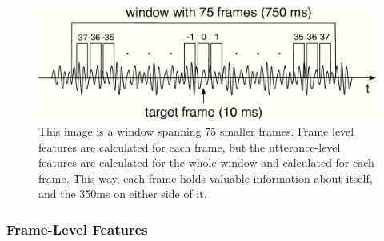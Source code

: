 \documentclass[a4paper,11pt,notitlepage]{article}
\begin{document}
\begin{figure}[H]\vspace{0.3cm}
	\centering
	\includegraphics[scale = 0.40]{figs/frames}
	\caption{This image is a window spanning 75 smaller frames. Frame level features are calculated for each frame, but the utterance-level features are calculated for the whole window and calculated for each frame. This way, each frame holds valuable information about itself, and the 350ms on either side of it.\cite{knox2007automatic}}
	\label{frames}
\end{figure}

\subsubsection{Frame-Level Features}
\end{document}
